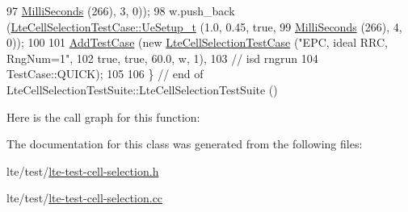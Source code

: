 \begin{DoxyCode}
97                                                     \hyperlink{group__timecivil_gaf26127cf4571146b83a92ee18679c7a9}{MilliSeconds} (266), 3, 0));
98   w.push\_back (\hyperlink{structLteCellSelectionTestCase_1_1UeSetup__t}{LteCellSelectionTestCase::UeSetup\_t} (1.0, 0.45, \textcolor{keyword}{true},
99                                                     \hyperlink{group__timecivil_gaf26127cf4571146b83a92ee18679c7a9}{MilliSeconds} (266), 4, 0));
100 
101   \hyperlink{classns3_1_1TestCase_a3718088e3eefd5d6454569d2e0ddd835}{AddTestCase} (\textcolor{keyword}{new} \hyperlink{classLteCellSelectionTestCase}{LteCellSelectionTestCase} (\textcolor{stringliteral}{"EPC, ideal RRC, RngNum=1"},
102                                              \textcolor{keyword}{true}, \textcolor{keyword}{true}, 60.0, w, 1),
103                \textcolor{comment}{//                                        isd      rngrun}
104                TestCase::QUICK);
105 
106 \} \textcolor{comment}{// end of LteCellSelectionTestSuite::LteCellSelectionTestSuite ()}
\end{DoxyCode}


Here is the call graph for this function\+:




The documentation for this class was generated from the following files\+:\begin{DoxyCompactItemize}
\item 
lte/test/\hyperlink{lte-test-cell-selection_8h}{lte-\/test-\/cell-\/selection.\+h}\item 
lte/test/\hyperlink{lte-test-cell-selection_8cc}{lte-\/test-\/cell-\/selection.\+cc}\end{DoxyCompactItemize}

